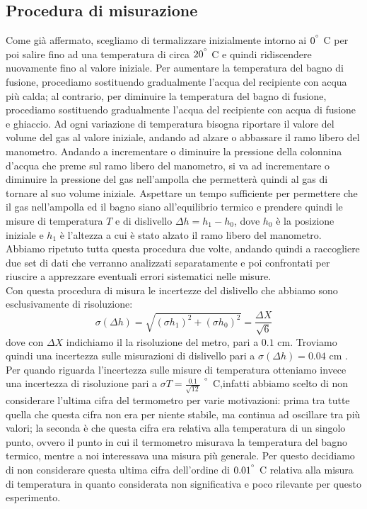\subsection{Procedura di misurazione}
Come già affermato, scegliamo di termalizzare inizialmente intorno ai $0^{\degree}$ C per poi salire fino ad una temperatura di circa $20^{\degree}$ C e quindi ridiscendere nuovamente fino al valore iniziale.
Per aumentare la temperatura del bagno di fusione, procediamo sostituendo gradualmente l'acqua del recipiente con acqua più calda; al contrario, per diminuire la temperatura del bagno di fusione, procediamo sostituendo gradualmente l'acqua del recipiente con acqua di fusione e ghiaccio.
Ad ogni variazione di temperatura bisogna riportare il valore del volume del gas al valore iniziale, andando ad alzare o abbassare il ramo libero del manometro.
Andando a incrementare o diminuire la pressione della colonnina d'acqua che preme sul ramo libero del manometro, si va ad incrementare o diminuire la pressione del gas nell'ampolla che permetterà quindi al gas di tornare al suo volume iniziale.
Aspettare un tempo sufficiente per permettere che il gas nell'ampolla ed il bagno siano all'equilibrio termico e prendere quindi le misure di temperatura $T$ e di dislivello $\Delta h = h_1 - h_0$, dove $h_0$ è la posizione iniziale e $h_1$ è l'altezza a cui è stato alzato il ramo libero del manometro.
Abbiamo ripetuto tutta questa procedura due volte, andando quindi a raccogliere due set di dati che verranno analizzati separatamente e poi confrontati per riuscire a apprezzare eventuali errori sistematici nelle misure.
\\
Con questa procedura di misura le incertezze del dislivello che abbiamo sono esclusivamente di risoluzione:
\begin{equation}
\sigma (\Delta h) = \sqrt{(\sigma h_1)^2 + (\sigma h_0)^2} = \frac{\Delta X}{\sqrt{6}}
\end{equation}
dove con $\Delta X$ indichiamo il la risoluzione del metro, pari a $0.1$ cm.
Troviamo quindi una incertezza sulle misurazioni di dislivello pari a $\sigma (\Delta h) = 0.04$ cm .
Per quando riguarda l'incertezza sulle misure di temperatura otteniamo invece una incertezza di risoluzione pari a $\sigma T = \frac{0.1}{\sqrt{12}}$ $^{\degree}$ C,infatti abbiamo scelto di non considerare l'ultima cifra del termometro per varie motivazioni: prima tra tutte quella che questa cifra non era per niente stabile, ma continua ad oscillare tra più valori; la seconda è che questa cifra era relativa alla temperatura di un singolo punto, ovvero il punto in cui il termometro misurava la temperatura del bagno termico, mentre a noi interessava una misura più generale.
Per questo decidiamo di non considerare questa ultima cifra dell'ordine di $0.01^{\degree}$ C relativa alla misura di temperatura in quanto considerata non significativa e poco rilevante per questo esperimento.

